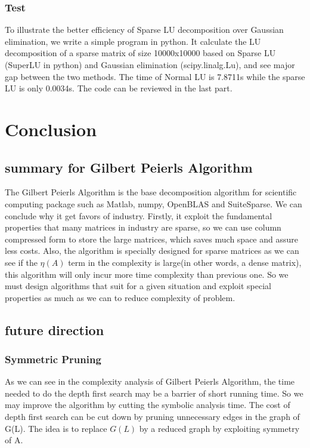 \documentclass[11pt]{article}
\begin{document}
\subsubsection{Test}
To illustrate the better efficiency of Sparse LU decomposition over Gaussian elimination, we write a simple program in python. It calculate the LU decomposition of a sparse matrix of size 10000x10000 based on Sparse LU (SuperLU in python) and Gaussian elimination (scipy.linalg.Lu), and see major gap between the two methods. The time of Normal LU is 7.8711s while the sparse LU is only 0.0034s. The code can be reviewed in the last part.
\section{Conclusion}
\subsection{summary for Gilbert Peierls Algorithm }
The Gilbert Peierls Algorithm is the base decomposition algorithm for scientific computing package such as Matlab, numpy, OpenBLAS and SuiteSparse. We can conclude why it get favors of industry. Firstly, it exploit the fundamental properties that many matrices in industry are sparse, so we can use column compressed form to store the large matrices, which saves much space and assure less costs. Also, the  algorithm is specially designed for sparse matrices as we can see if the $\eta(A)$ term in the complexity is large(in other words, a dense matrix), this algorithm will only incur more time complexity than previous one. So we must design algorithms that suit for a given situation and exploit special properties as much as we can to reduce complexity of problem.

\subsection{future direction}
\subsubsection{Symmetric Pruning}
As we can see in the complexity analysis of Gilbert Peierls Algorithm, the time needed to do the depth first search may be a barrier of short running time. So we may improve the algorithm by cutting the symbolic analysis time. The cost of depth first search can be cut down by pruning unnecessary edges in the graph of  G(L). The idea is to replace $G(L)$ by a reduced graph by exploiting symmetry of A.
\end{document}
